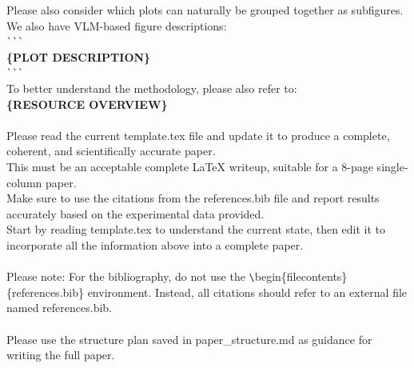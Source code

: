 \begin{tcolorbox}[colback=gray!10, colframe=gray!40!black, breakable=true, title=Prompt for Detailed Writing]
Please also consider which plots can naturally be grouped together as subfigures.\\

We also have VLM-based figure descriptions:\\
\verb|```|\\
\textbf{\{PLOT DESCRIPTION\}}\\
\verb|```|\\

To better understand the methodology, please also refer to:\\
\textbf{\{RESOURCE OVERVIEW\}}\\
\\
Please read the current template.tex file and update it to produce a complete, coherent, and scientifically accurate paper.\\
This must be an acceptable complete LaTeX writeup, suitable for a 8-page single-column paper.\\
Make sure to use the citations from the references.bib file and report results accurately based on the experimental data provided.\\
Start by reading template.tex to understand the current state, then edit it to incorporate all the information above into a complete paper.\\
\\
Please note: For the bibliography, do not use the \verb|\|begin\{filecontents\}\{references.bib\} environment. Instead, all citations should refer to an external file named references.bib.\\
\\
Please use the structure plan saved in paper\_structure.md as guidance for writing the full paper.
\end{tcolorbox}


